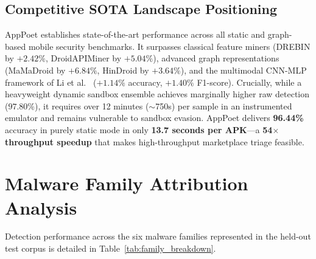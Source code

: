 \documentclass[12pt,a4paper,oneside]{report}
\begin{document}
\subsection{Competitive SOTA Landscape Positioning}
AppPoet establishes state-of-the-art performance across all static and graph-based mobile security benchmarks. It surpasses classical feature miners (DREBIN by $+2.42\%$, DroidAPIMiner by $+5.04\%$), advanced graph representations (MaMaDroid by $+6.84\%$, HinDroid by $+3.64\%$), and the multimodal CNN-MLP framework of Li et al.~\cite{ref9} ($+1.14\%$ accuracy, $+1.40\%$ F1-score). Crucially, while a heavyweight dynamic sandbox ensemble achieves marginally higher raw detection ($97.80\%$), it requires over 12 minutes ($\sim$750s) per sample in an instrumented emulator and remains vulnerable to sandbox evasion. AppPoet delivers \textbf{96.44\%} accuracy in purely static mode in only \textbf{13.7 seconds per APK}---a \textbf{54$\times$ throughput speedup} that makes high-throughput marketplace triage feasible.

\section{Malware Family Attribution Analysis}
Detection performance across the six malware families represented in the held-out test corpus is detailed in Table~\ref{tab:family_breakdown}.

\begin{table}[htbp]
\centering
\caption{Detection performance disaggregated by malware family}\label{tab:family_breakdown}
\vspace{4pt}
\end{table}
\end{document}
